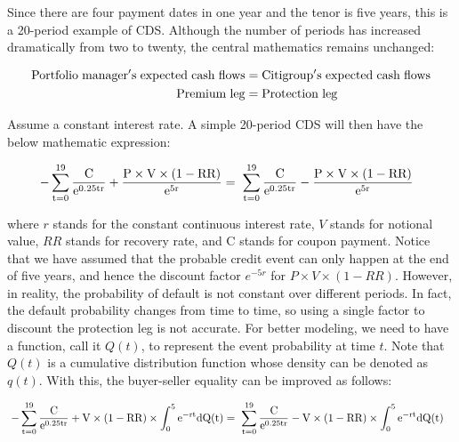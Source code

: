 \documentclass{jss}
\begin{document}
Since there are four payment dates in one year and the tenor is five years, this is a 20-period example of CDS.
Although the number of periods has increased dramatically from two to twenty, the central mathematics remains unchanged:

\begin{align}
  \rm Portfolio\hspace{3pt}manager's\hspace{3pt}expected\hspace{3pt}cash\hspace{3pt}flows &= \rm Citigroup's\hspace{3pt}expected\hspace{3pt}cash\hspace{3pt}flows \\
  \rm Premium\hspace{3pt}leg &= \rm Protection\hspace{3pt}leg
\end{align}

Assume a constant interest rate. A simple 20-period CDS will then have the below mathematic expression:

\begin{align}
  \rm \hspace{3pt}- \sum_{t = 0}^{19} \frac{C}{e^{0.25tr}} + \frac{P \times V \times (1 - RR)}{e^{5r}}  &= \rm \hspace{3pt} \sum_{t = 0}^{19} \frac{C}{e^{0.25tr}} - \frac{P \times V \times (1 - RR)}{e^{5r}} 
\end{align}

where $r$ stands for the constant continuous interest rate, $V$ stands for notional value, $RR$ stands for recovery rate, and C stands for coupon payment. Notice that we have assumed that the probable credit event can only happen at the end of five years, and hence the discount factor $e^{-5r}$ for $P \times V \times (1 - RR)$. However, in reality, the probability of default is not constant over different periods. In fact, the default probability changes from time to time, so using a single factor to discount the protection leg is not accurate. For better modeling, we need to have a function, call it $Q(t)$, to represent the event probability at time $t$. Note that $Q(t)$ is a cumulative distribution function whose density can be denoted as $q(t)$. With this, the buyer-seller equality can be improved as follows:

\begin{align}
  \rm \hspace{3pt}- \sum_{t = 0}^{19} \frac{C}{e^{0.25tr}} + V \times (1 - RR) \times \int_0^5 e^{-rt}dQ(t)  &= \rm \hspace{3pt} \sum_{t = 0}^{19} \frac{C}{e^{0.25tr}} - V \times (1 - RR) \times \int_0^5 e^{-rt}dQ(t) 
\end{align}
\end{document}
